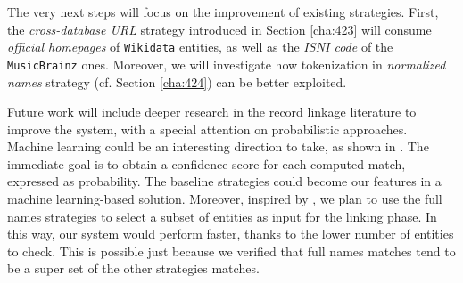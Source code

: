 The very next steps will focus on the improvement of existing strategies.
First, the \textit{cross-database URL} strategy introduced in Section \ref{cha:423} will consume \textit{official homepages} of \texttt{Wikidata} entities, as well as the \textit{ISNI code} of the \texttt{MusicBrainz} ones. Moreover, we will investigate how tokenization in \textit{normalized names} strategy (cf. Section \ref{cha:424}) can be better exploited.

Future work will include deeper research in the record linkage literature to improve the system, with a special attention on probabilistic approaches.
Machine learning could be an interesting direction to take, as shown in \cite{DBLP:conf/semweb/NechaevCG17a}.
The immediate goal is to obtain a confidence score for each computed match, expressed as probability.
The baseline strategies could become our features in a machine learning-based solution.
Moreover, inspired by \cite{DBLP:conf/semweb/NechaevCG17a}, we plan to use the full names strategies to select a subset of entities as input for the linking phase.
In this way, our system would perform faster, thanks to the lower number of entities to check. This is possible just because we verified that full names matches tend to be a super set of the other strategies matches.

\clearpage
\newpage
\mbox{~}
\clearpage
\newpage